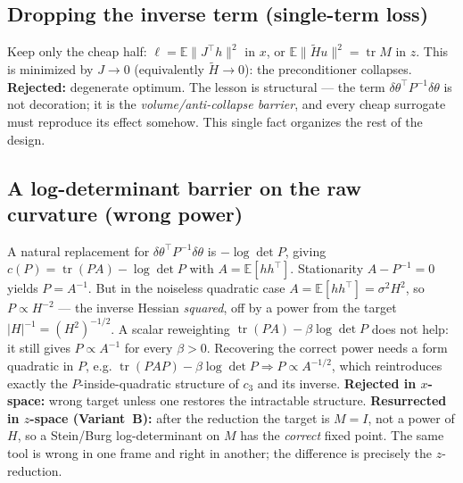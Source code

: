 \documentclass[11pt]{article}
\theoremstyle{plain}
\theoremstyle{definition}
\theoremstyle{remark}
\DeclareMathOperator{\tr}{tr}
\newcommand{\E}{\mathbb{E}}
\newcommand{\norm}[1]{\lVert #1 \rVert}
\newcommand{\tHess}{\tilde{H}}
\begin{document}
\subsection{Dropping the inverse term (single-term loss)}
\label{sub:single}
Keep only the cheap half: $\ell=\E\norm{J^{\!\top}h}^2$ in $x$, or $\E\norm{\tHess u}^2=\tr M$
in $z$. This is minimized by $J\to0$ (equivalently $\tHess\to0$): the preconditioner
collapses. \textbf{Rejected:} degenerate optimum. The lesson is structural --- the term
$\delta\theta^{\!\top}P^{-1}\delta\theta$ is not decoration; it is the \emph{volume/anti-collapse
barrier}, and every cheap surrogate must reproduce its effect somehow. This single fact
organizes the rest of the design.

\subsection{A log-determinant barrier on the raw curvature (wrong power)}
\label{sub:logdet-wrong}
A natural replacement for $\delta\theta^{\!\top}P^{-1}\delta\theta$ is $-\log\det P$, giving
$c(P)=\tr(PA)-\log\det P$ with $A=\E[hh^{\!\top}]$. Stationarity $A-P^{-1}=0$ yields
$P=A^{-1}$. But in the noiseless quadratic case $A=\E[hh^{\!\top}]=\sigma^2 H^2$, so
$P\propto H^{-2}$ --- the inverse Hessian \emph{squared}, off by a power from the target
$|H|^{-1}=(H^2)^{-1/2}$. A scalar reweighting $\tr(PA)-\beta\log\det P$ does not help: it
still gives $P\propto A^{-1}$ for every $\beta>0$. Recovering the correct power needs a
form quadratic in $P$, e.g. $\tr(PAP)-\beta\log\det P\Rightarrow P\propto A^{-1/2}$, which
reintroduces exactly the $P$-inside-quadratic structure of $c_3$ and its inverse.
\textbf{Rejected in $x$-space:} wrong target unless one restores the intractable structure.
\textbf{Resurrected in $z$-space (Variant~B):} after the reduction the target is $M=I$, not
a power of $H$, so a Stein/Burg log-determinant on $M$ has the \emph{correct} fixed point.
The same tool is wrong in one frame and right in another; the difference is precisely the
$z$-reduction.

\end{document}
